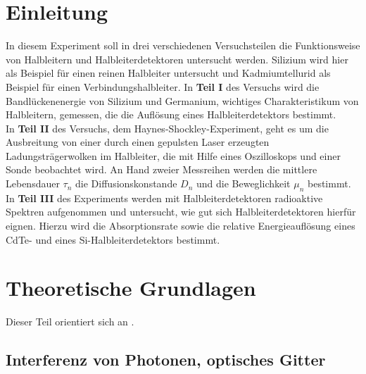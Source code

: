 \documentclass[12pt]{article}
\title{\vspace{0cm}{\Huge Fortgeschrittenen-Praktikum I:\\ \vspace{1cm}  Halbleiter}}
\author{Saskia Bondza\\Simon Stephan}
\date{Durchgeführt am 07.09.2016}
\begin{document}
\maketitle
\newpage

\thispagestyle{empty}
\tableofcontents
\newpage

\section{Einleitung}

In diesem Experiment soll in drei verschiedenen Versuchsteilen die Funktionsweise von Halbleitern und Halbleiterdetektoren untersucht werden. Silizium wird hier als Beispiel für einen reinen Halbleiter untersucht und Kadmiumtellurid als Beispiel für einen Verbindungshalbleiter.
In \textbf{Teil I} des Versuchs wird die Bandlückenenergie von Silizium und Germanium, wichtiges Charakteristikum von Halbleitern, gemessen, die die Auflösung eines Halbleiterdetektors bestimmt. \\
In \textbf{Teil II} des Versuchs,  dem Haynes-Shockley-Experiment, geht es um die Ausbreitung
von einer durch einen gepulsten Laser erzeugten Ladungsträgerwolken im Halbleiter, die mit Hilfe eines Oszilloskops und einer Sonde beobachtet wird. An Hand zweier Messreihen werden die mittlere Lebensdauer $\tau_n$ die Diffusionskonstande $D_n$ und die Beweglichkeit $\mu_n$ bestimmt. In \textbf{Teil III} des Experiments werden mit Halbleiterdetektoren radioaktive Spektren aufgenommen und untersucht, wie gut sich Halbleiterdetektoren hierfür eignen. Hierzu wird die Absorptionsrate sowie die relative Energieauflösung eines CdTe- und eines Si-Halbleiterdetektors bestimmt.


\newpage
\section[Theoretische Grundlagen]{Theoretische Grundlagen}

Dieser Teil orientiert sich an \cite{staat}.



\subsection{Interferenz von Photonen, optisches Gitter}
\end{document}
